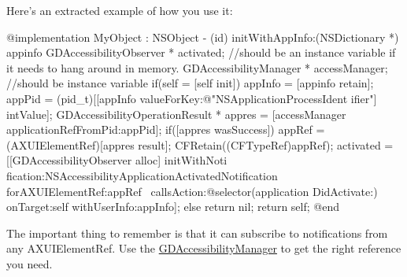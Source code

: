 Here's an extracted example of how you use it: 
\begin{DoxyCode}
 @implementation MyObject : NSObject
 - (id) initWithAppInfo:(NSDictionary *) appinfo {
        GDAccessibilityObserver * activated; //should be an instance variable if 
      it needs to hang around in memory.
        GDAccessibilityManager * accessManager; //should be instance variable
        if(self = [self init]) {
                appInfo = [appinfo retain];
                appPid = (pid_t)[[appInfo valueForKey:@"NSApplicationProcessIdent
      ifier"] intValue];
                GDAccessibilityOperationResult * appres = [accessManager 
      applicationRefFromPid:appPid];
                if([appres wasSuccess]) {
                        appRef = (AXUIElementRef)[appres result];
                        CFRetain((CFTypeRef)appRef);
                        activated = [[GDAccessibilityObserver alloc] initWithNoti
      fication:NSAccessibilityApplicationActivatedNotification forAXUIElementRef:appRef
       \
                                                callsAction:@selector(application
      DidActivate:) onTarget:self withUserInfo:appInfo];
                } else {
                        return nil;
                }
        }
        return self;
 }
 @end
\end{DoxyCode}


The important thing to remember is that it can subscribe to notifications from any AXUIElementRef. Use the \hyperlink{interface_g_d_accessibility_manager}{GDAccessibilityManager} to get the right reference you need.

